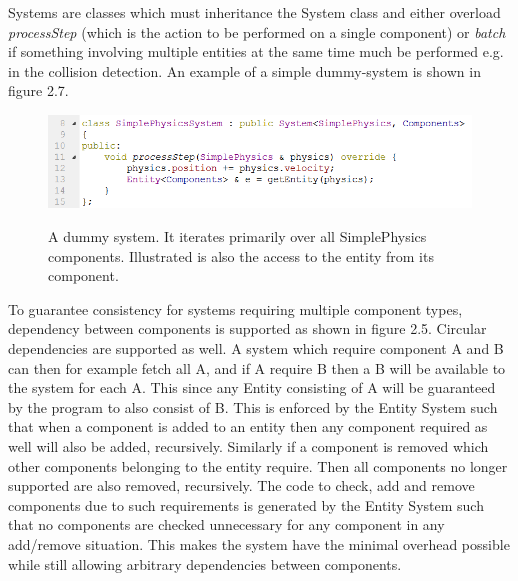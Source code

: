 Systems are classes which must inheritance the System class and either overload \textit{processStep} (which is the action to be performed on a single component) or \textit{batch} if something involving multiple entities at the same time much be performed e.g. in the collision detection. An example of a simple dummy-system is shown in figure 2.7.
\begin{figure}[H]
  \centering
  \includegraphics[width=0.9\linewidth]{images/simplePhysicsSystem.png}
  \label{fig:SimplePhysicsSystem}
  \caption{A dummy system. It iterates primarily over all SimplePhysics components. Illustrated is also the access to the entity from its component.}
\end{figure}
To guarantee consistency for systems requiring multiple component types, dependency between components is supported as shown in figure 2.5. Circular dependencies are supported as well. A system which require component A and B can then for example fetch all A, and if A require B then a B will be available to the system for each A. This since any Entity consisting of A will be guaranteed by the program to also consist of B. This is enforced by the Entity System such that when a component is added to an entity then any component required as well will also be added, recursively. Similarly if a component is removed which other components belonging to the entity require. Then all components no longer supported are also removed, recursively. The code to check, add and remove components due to such requirements is generated by the Entity System such that no components are checked unnecessary for any component in any add/remove situation. This makes the system have the minimal overhead possible while still allowing arbitrary dependencies between components. 

